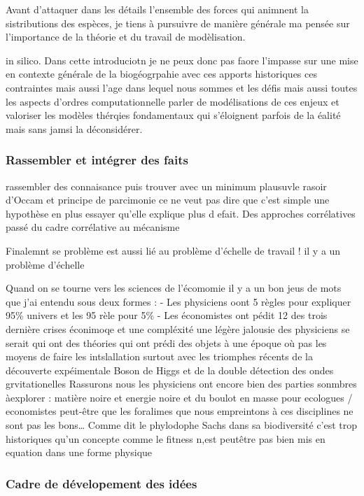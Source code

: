Avant d'attaquer dans les détails l'ensemble des forces qui animnent la
sistributions des espèces, je tiens à pursuivre de manière générale ma
pensée sur l'importance de la théorie et du travail de modèlisation.

in silico. Dans cette introduciotn je ne peux donc pas faore l'impasse
sur une mise en contexte générale de la biogéogrpahie avec ces apports
historiques ces contraintes mais aussi l'age dans lequel nous sommes et
les défis mais aussi toutes les aspects d'ordres computationnelle parler
de modélisations de ces enjeux et valoriser les modèles thérqies
fondamentaux qui s'éloignent parfois de la éalité mais sans jamsi la
déconsidérer.

\subsubsection*{Rassembler et intégrer des
faits}\label{rassembler-et-intuxe9grer-des-faits}

rassembler des connaisance puis trouver avec un minimum plausuvle rasoir
d'Occam et principe de parcimonie ce ne veut pas dire que c'est simple
une hypothèse en plus essayer qu'elle explique plus d efait. Des
approches corrélatives passé du cadre corrélative au mécanisme

Finalemnt se problème est aussi lié au problème d'échelle de travail !
il y a un problème d'échelle

Quand on se tourne vers les sciences de l'écomomie il y a un bon jeus de
mots que j'ai entendu sous deux formes : - Les physiciens oont 5 règles
pour expliquer 95\% univers et les 95 rèle pour 5\% - Les économistes
ont pédit 12 des trois dernière crises éconimoqe et une compléxité une
légère jalousie des physiciens se serait qui ont des théories qui ont
prédi des objets à une époque où pas les moyens de faire les
intslallation surtout avec les triomphes récents de la découverte
expéimentale Boson de Higgs et de la double détection des ondes
grvitationelles Rassurons nous les physiciens ont encore bien des
parties sonmbres àexplorer : matière noire et energie noire et du boulot
en masse pour ecologues / economistes peut-être que les foralimes que
nous empreintons à ces disciplines ne sont pas les bons\ldots{} Comme
dit le phylodophe Sachs dans sa biodiversité c'est trop historiques
qu'un concepte comme le fitness n,est peutêtre pas bien mis en equation
dans une forme physique

\subsubsection*{Cadre de dévelopement des
idées}\label{cadre-de-duxe9velopement-des-iduxe9es}

